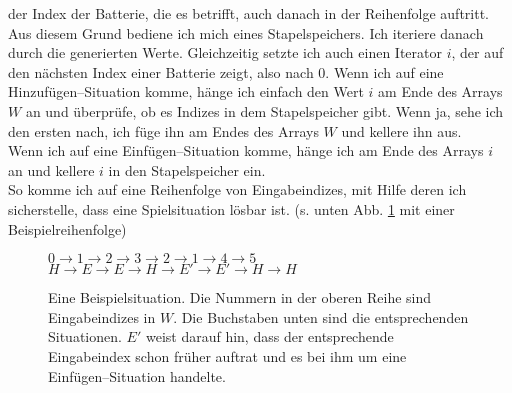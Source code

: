 \documentclass[a4paper,10pt,ngerman]{scrartcl}
\begin{document}
der Index der Batterie, die es betrifft, auch danach in der Reihenfolge auftritt. Aus diesem Grund bediene ich mich eines Stapelspeichers.
Ich iteriere danach durch die generierten Werte. Gleichzeitig setzte ich auch einen Iterator $i$,
der auf den nächsten Index einer Batterie zeigt, also nach 0. 
Wenn ich auf eine Hinzufügen--Situation komme, hänge ich einfach den Wert $i$ am Ende des Arrays $W$ an
und überprüfe, ob es Indizes in dem Stapelspeicher gibt. Wenn ja, sehe ich den ersten nach,
ich füge ihn am Endes des Arrays $W$ und kellere ihn aus.\\
Wenn ich auf eine Einfügen--Situation komme, hänge ich am Ende des Arrays $i$ an und kellere $i$ in den Stapelspeicher ein.\\
So komme ich auf eine Reihenfolge von Eingabeindizes, mit Hilfe deren ich sicherstelle, dass eine Spielsituation lösbar ist.
(s. unten Abb. \ref{fig:ex-order} mit einer Beispielreihenfolge)\\

\begin{figure}[h]
\centering
$0 \longrightarrow 1 \longrightarrow 2 \longrightarrow 3 \longrightarrow 2 \longrightarrow 1 \longrightarrow 4 \longrightarrow 5$\\
$H \rightarrow E \rightarrow E \rightarrow H \rightarrow E' \rightarrow E' \rightarrow H \rightarrow H$
\caption{Eine Beispielsituation. Die Nummern in der oberen Reihe sind Eingabeindizes in $W$.
Die Buchstaben unten sind die entsprechenden Situationen. $E'$ weist darauf hin, dass der entsprechende Eingabeindex
schon früher auftrat und es bei ihm um eine Einfügen--Situation handelte.}
\label{fig:ex-order}
\end{figure}
\end{document}
